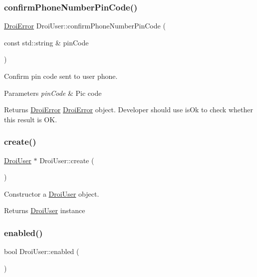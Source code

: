 \subsubsection{\texorpdfstring{confirm\+Phone\+Number\+Pin\+Code()}{confirmPhoneNumberPinCode()}}
{\footnotesize\ttfamily \hyperlink{class_droi_error}{Droi\+Error} Droi\+User\+::confirm\+Phone\+Number\+Pin\+Code (\begin{DoxyParamCaption}\item[{const std\+::string \&}]{pin\+Code }\end{DoxyParamCaption})}

Confirm pin code sent to user phone.


\begin{DoxyParams}{Parameters}
{\em pin\+Code} & Pic code \\
\hline
\end{DoxyParams}
\begin{DoxyReturn}{Returns}
\hyperlink{class_droi_error}{Droi\+Error} \hyperlink{class_droi_error}{Droi\+Error} object. Developer should use is\+Ok to check whether this result is OK. 
\end{DoxyReturn}
\mbox{\label{class_droi_user_a74b3c07a144ae1c916c4d3636c5a4959}} 
\subsubsection{\texorpdfstring{create()}{create()}}
{\footnotesize\ttfamily \hyperlink{class_droi_user}{Droi\+User} $\ast$ Droi\+User\+::create (\begin{DoxyParamCaption}{ }\end{DoxyParamCaption})\hspace{0.3cm}{\ttfamily [static]}}

Constructor a \hyperlink{class_droi_user}{Droi\+User} object. \begin{DoxyReturn}{Returns}
\hyperlink{class_droi_user}{Droi\+User} instance 
\end{DoxyReturn}
\mbox{\label{class_droi_user_ae2f95d9b44530fe46358b8ac584d844f}} 
\subsubsection{\texorpdfstring{enabled()}{enabled()}}
{\footnotesize\ttfamily bool Droi\+User\+::enabled (\begin{DoxyParamCaption}{ }\end{DoxyParamCaption})}

